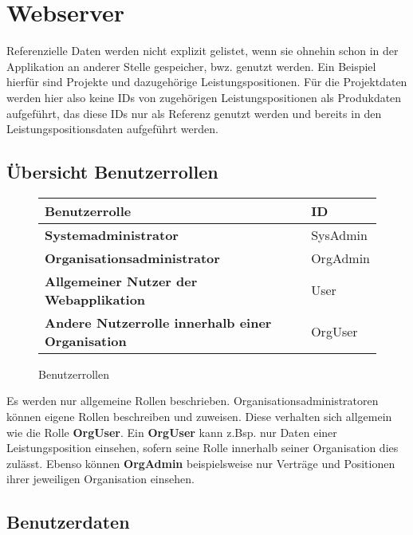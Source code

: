 \section{Webserver}

Referenzielle Daten werden nicht explizit gelistet, wenn sie ohnehin schon in der Applikation an anderer Stelle gespeicher, bwz. genutzt werden.
Ein Beispiel hierfür sind Projekte und dazugehörige Leistungspositionen. Für die Projektdaten werden hier also keine IDs von zugehörigen Leistungspositionen
als Produkdaten aufgeführt, das diese IDs nur als Referenz genutzt werden und bereits in den Leistungspositionsdaten aufgeführt werden.

\subsection{Übersicht Benutzerrollen}

\begin{figure}[h]
	\centering
	\begin{tabularx}{\textwidth}{| X | X |}
        \hline
		\textbf{Benutzerrolle} & \textbf{ID} \\ \hline \hline
		\textbf{Systemadministrator} & SysAdmin \\ \hline
		\textbf{Organisationsadministrator} & OrgAdmin \\ \hline
        \textbf{Allgemeiner Nutzer der Webapplikation} & User \\ \hline
		\textbf{Andere Nutzerrolle innerhalb einer Organisation} & OrgUser \\ \hline
	\end{tabularx}
	\caption{Benutzerrollen}
	\label{fig:Benutzerrollen}
\end{figure}

\begin{flushleft}
Es werden nur allgemeine Rollen beschrieben. Organisationsadministratoren können eigene Rollen beschreiben und zuweisen. Diese verhalten sich allgemein wie die Rolle \textbf{OrgUser}.
Ein \textbf{OrgUser} kann z.Bsp. nur Daten einer Leistungsposition einsehen, sofern seine Rolle innerhalb seiner Organisation dies zulässt. Ebenso können \textbf{OrgAdmin} beispielsweise nur Verträge und
Positionen ihrer jeweiligen Organisation einsehen.
\end{flushleft}

\subsection{Benutzerdaten}

